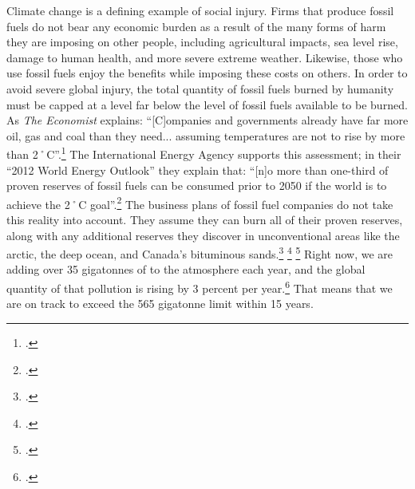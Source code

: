 Climate change is a defining example of social injury.
Firms that produce fossil fuels do not bear any economic burden as a result of the many forms of harm they are imposing on other people, including agricultural impacts, sea level rise, damage to human health, and more severe extreme weather.
Likewise, those who use fossil fuels enjoy the benefits while imposing these costs on others.
In order to avoid severe global injury, the total quantity of fossil fuels burned by humanity must be capped at a level far below the level of fossil fuels available to be burned. 
As \emph{The Economist} explains: ``[C]ompanies and governments already have far more oil, gas and coal than they need... assuming temperatures are not to rise by more than 2˚C''.\footcite[][]{EconomistUnburnable}
The International Energy Agency supports this assessment; in their ``2012 World Energy Outlook'' they explain that: ``[n]o more than one-third of proven reserves of fossil fuels can be consumed prior to 2050 if the world is to achieve the 2˚C goal''.\footcite[][p. 25]{IEA2012}
The business plans of fossil fuel companies do not take this reality into account.
They assume they can burn all of their proven reserves, along with any additional reserves they discover in unconventional areas like the arctic, the deep ocean, and Canada's bituminous sands.\footcite[U.S. Energy Information Administration estimates that there are 345 billion barrels of recoverable shale oil around the world, and 7,299 trillion cubic feet of shale gas: ][]{EIAShaleOilGas} \footcite[In their 2012 annual report, Shell describes how in the future they expect more of their ``production to come from unconventional sources than at present'' and how ``it is expected that both the  intensity of our production, as well as our absolute Upstream  emissions, will increase as our business grows''.][p. 14]{ShellAnnualReport2012} \footcite[BP expresses a similar concern: ``Over the long term it is likely that the carbon intensity of our upstream operations will continue to trend upwards as we move further into technically challenging and potentially more energy-intensive areas''.][p. 52]{BPAnnualReport2013}
Right now, we are adding over 35 gigatonnes of  to the atmosphere each year, and the global quantity of that pollution is rising by 3 percent per year.\footcite[][p. 26]{IPCCar4_syr}
That means that we are on track to exceed the 565 gigatonne limit within 15 years.



